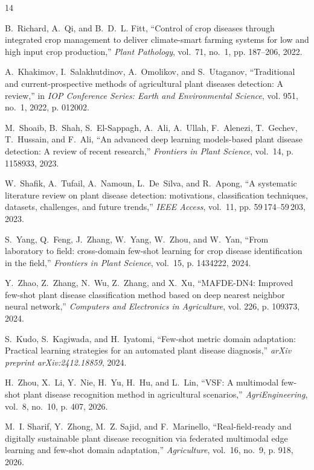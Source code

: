 \documentclass[conference]{IEEEtran}
\begin{document}
\begin{thebibliography}{14}

B.~Richard, A.~Qi, and B.~D.~L. Fitt, ``Control of crop diseases through integrated crop management to deliver climate-smart farming systems for low and high input crop production,'' \emph{Plant Pathology}, vol.~71, no.~1, pp. 187--206, 2022.

A.~Khakimov, I.~Salakhutdinov, A.~Omolikov, and S.~Utaganov, ``Traditional and current-prospective methods of agricultural plant diseases detection: A review,'' in \emph{IOP Conference Series: Earth and Environmental Science}, vol. 951, no.~1, 2022, p. 012002.

M.~Shoaib, B.~Shah, S.~El-Sappagh, A.~Ali, A.~Ullah, F.~Alenezi, T.~Gechev, T.~Hussain, and F.~Ali, ``An advanced deep learning models-based plant disease detection: A review of recent research,'' \emph{Frontiers in Plant Science}, vol.~14, p. 1158933, 2023.

W.~Shafik, A.~Tufail, A.~Namoun, L.~De~Silva, and R.~Apong, ``A systematic literature review on plant disease detection: motivations, classification techniques, datasets, challenges, and future trends,'' \emph{IEEE Access}, vol.~11, pp. 59\,174--59\,203, 2023.

S.~Yang, Q.~Feng, J.~Zhang, W.~Yang, W.~Zhou, and W.~Yan, ``From laboratory to field: cross-domain few-shot learning for crop disease identification in the field,'' \emph{Frontiers in Plant Science}, vol.~15, p. 1434222, 2024.

Y.~Zhao, Z.~Zhang, N.~Wu, Z.~Zhang, and X.~Xu, ``MAFDE-DN4: Improved few-shot plant disease classification method based on deep nearest neighbor neural network,'' \emph{Computers and Electronics in Agriculture}, vol. 226, p. 109373, 2024.

S.~Kudo, S.~Kagiwada, and H.~Iyatomi, ``Few-shot metric domain adaptation: Practical learning strategies for an automated plant disease diagnosis,'' \emph{arXiv preprint arXiv:2412.18859}, 2024.

H.~Zhou, X.~Li, Y.~Nie, H.~Yu, H.~Hu, and L.~Lin, ``VSF: A multimodal few-shot plant disease recognition method in agricultural scenarios,'' \emph{AgriEngineering}, vol.~8, no.~10, p. 407, 2026.

M.~I. Sharif, Y.~Zhong, M.~Z. Sajid, and F.~Marinello, ``Real-field-ready and digitally sustainable plant disease recognition via federated multimodal edge learning and few-shot domain adaptation,'' \emph{Agriculture}, vol.~16, no.~9, p. 918, 2026.


\end{thebibliography}
\end{document}
